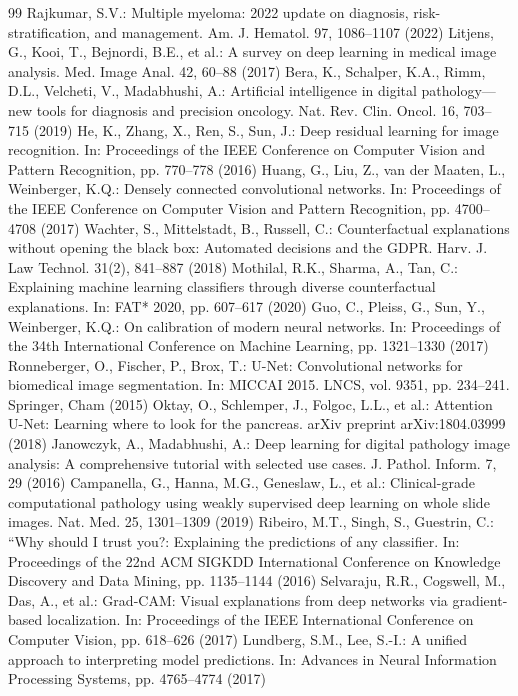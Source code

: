 \documentclass[runningheads]{llncs}
\begin{document}
\begin{thebibliography}{99}
 Rajkumar, S.V.: Multiple myeloma: 2022 update on diagnosis, risk-stratification, and management. Am. J. Hematol. 97, 1086--1107 (2022)
 Litjens, G., Kooi, T., Bejnordi, B.E., et al.: A survey on deep learning in medical image analysis. Med. Image Anal. 42, 60--88 (2017)
 Bera, K., Schalper, K.A., Rimm, D.L., Velcheti, V., Madabhushi, A.: Artificial intelligence in digital pathology---new tools for diagnosis and precision oncology. Nat. Rev. Clin. Oncol. 16, 703--715 (2019)
 He, K., Zhang, X., Ren, S., Sun, J.: Deep residual learning for image recognition. In: Proceedings of the IEEE Conference on Computer Vision and Pattern Recognition, pp. 770--778 (2016)
 Huang, G., Liu, Z., van der Maaten, L., Weinberger, K.Q.: Densely connected convolutional networks. In: Proceedings of the IEEE Conference on Computer Vision and Pattern Recognition, pp. 4700--4708 (2017)
 Wachter, S., Mittelstadt, B., Russell, C.: Counterfactual explanations without opening the black box: Automated decisions and the GDPR. Harv. J. Law Technol. 31(2), 841--887 (2018)
 Mothilal, R.K., Sharma, A., Tan, C.: Explaining machine learning classifiers through diverse counterfactual explanations. In: FAT* 2020, pp. 607--617 (2020)
 Guo, C., Pleiss, G., Sun, Y., Weinberger, K.Q.: On calibration of modern neural networks. In: Proceedings of the 34th International Conference on Machine Learning, pp. 1321--1330 (2017)
 Ronneberger, O., Fischer, P., Brox, T.: U-Net: Convolutional networks for biomedical image segmentation. In: MICCAI 2015. LNCS, vol. 9351, pp. 234--241. Springer, Cham (2015)
 Oktay, O., Schlemper, J., Folgoc, L.L., et al.: Attention U-Net: Learning where to look for the pancreas. arXiv preprint arXiv:1804.03999 (2018)
 Janowczyk, A., Madabhushi, A.: Deep learning for digital pathology image analysis: A comprehensive tutorial with selected use cases. J. Pathol. Inform. 7, 29 (2016)
 Campanella, G., Hanna, M.G., Geneslaw, L., et al.: Clinical-grade computational pathology using weakly supervised deep learning on whole slide images. Nat. Med. 25, 1301--1309 (2019)
 Ribeiro, M.T., Singh, S., Guestrin, C.: ``Why should I trust you?: Explaining the predictions of any classifier. In: Proceedings of the 22nd ACM SIGKDD International Conference on Knowledge Discovery and Data Mining, pp. 1135--1144 (2016)
 Selvaraju, R.R., Cogswell, M., Das, A., et al.: Grad-CAM: Visual explanations from deep networks via gradient-based localization. In: Proceedings of the IEEE International Conference on Computer Vision, pp. 618--626 (2017)
 Lundberg, S.M., Lee, S.-I.: A unified approach to interpreting model predictions. In: Advances in Neural Information Processing Systems, pp. 4765--4774 (2017)
\end{thebibliography}
\end{document}
